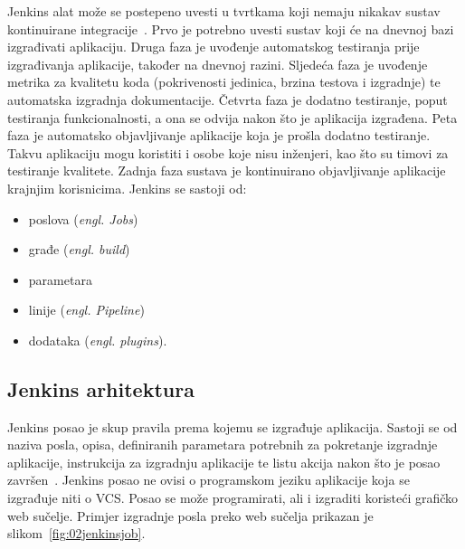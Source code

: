 Jenkins alat može se postepeno uvesti u tvrtkama koji nemaju nikakav sustav kontinuirane
integracije~\citep{smart2011jenkins}. Prvo je potrebno uvesti sustav koji će na dnevnoj bazi
izgrađivati aplikaciju. Druga faza je uvođenje automatskog testiranja prije izgrađivanja aplikacije,
također na dnevnoj razini. Sljedeća faza je uvođenje metrika za kvalitetu koda (pokrivenosti
jedinica, brzina testova i izgradnje) te automatska izgradnja dokumentacije. Četvrta faza je dodatno
testiranje, poput testiranja funkcionalnosti, a ona se odvija nakon što je aplikacija izgrađena.
Peta faza je automatsko objavljivanje aplikacije koja je prošla dodatno testiranje. Takvu
aplikaciju mogu koristiti i osobe koje nisu inženjeri, kao što su timovi za testiranje kvalitete.
Zadnja faza sustava je kontinuirano objavljivanje aplikacije krajnjim korisnicima. Jenkins se
sastoji od:
\begin{itemize}
    \item poslova (\textit{engl. Jobs})
    \item građe (\textit{engl. build})
    \item parametara
    \item linije (\textit{engl. Pipeline})
    \item dodataka (\textit{engl. plugins}).
\end{itemize}

\subsection{Jenkins arhitektura}
Jenkins posao je skup pravila prema kojemu se izgrađuje aplikacija. Sastoji se od naziva posla,
opisa, definiranih parametara potrebnih za pokretanje izgradnje aplikacije, instrukcija za
izgradnju aplikacije te listu akcija nakon što je posao završen~\citep{pathania2016learning}.
Jenkins posao ne ovisi o programskom jeziku aplikacije koja se izgrađuje niti o VCS. Posao se može
programirati, ali i izgraditi koristeći grafičko web sučelje. Primjer izgradnje posla preko web
sučelja prikazan je slikom~\ref{fig:02jenkinsjob}.

